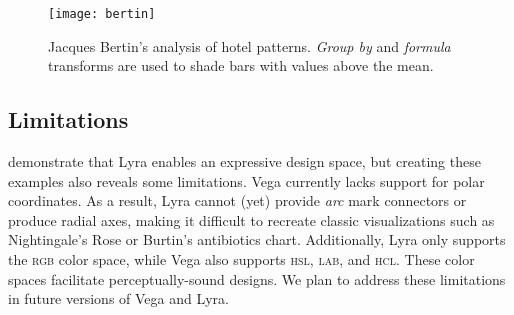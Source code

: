 \begin{figure}[h!]
  \centering
  \texttt{[image: bertin]}
  \caption{Jacques Bertin's analysis of hotel patterns. \emph{Group by} and \emph{formula}
 transforms are used to shade bars with values above the mean.}
  \label{fig:lyra:bertin}
\end{figure}

\clearpage

\subsection{Limitations}

\vspace{-7pt}

demonstrate that Lyra enables an expressive design space, but creating these
examples also reveals some limitations. Vega currently lacks support for polar
coordinates. As a result, Lyra cannot (yet) provide \emph{arc} mark connectors
or produce radial axes, making it difficult to recreate classic visualizations
such as Nightingale's Rose or Burtin's antibiotics chart. Additionally, Lyra
only supports the \textsc{rgb} color space, while Vega also supports
\textsc{hsl}, \textsc{lab}, and \textsc{hcl}. These color spaces facilitate
perceptually-sound designs. We plan to address these limitations in future
versions of Vega and Lyra.